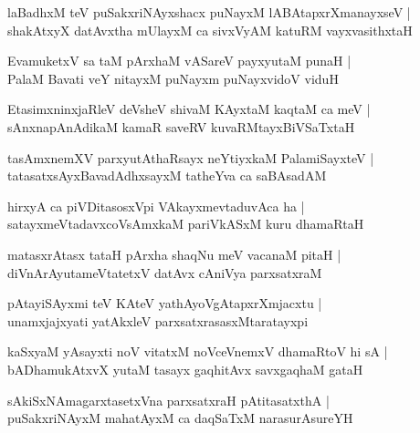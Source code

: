 \documentclass[twoside,12pt,openright]{book}
\newcounter{shloka}[chapter]
\begin{document}
\begin{shloka}%
laBadhxM teV puSakxriNAyxshacx puNayxM lABAtapxrXmanayxseV |\\
shakAtxyX datAvxtha mUlayxM ca sivxVyAM katuRM vayxvasithxtaH 
\end{shloka}

\begin{shloka}%
EvamuketxV sa taM pArxhaM vASareV payxyutaM punaH |\\
PalaM Bavati veY nitayxM puNayxm puNayxvidoV viduH 
\end{shloka}

\begin{shloka}%
EtasimxninxjaRleV deVsheV shivaM KAyxtaM kaqtaM ca meV |\\
sAnxnapAnAdikaM kamaR saveRV kuvaRMtayxBiVSaTxtaH 	
\end{shloka}

\begin{shloka}%
tasAmxnemXV parxyutAthaRsayx neYtiyxkaM PalamiSayxteV |\\
tatasatxsAyxBavadAdhxsayxM tatheYva ca saBAsadAM 
\end{shloka}

\begin{shloka}%
hirxyA ca piVDitasosxVpi VAkayxmevtaduvAca ha |\\
satayxmeVtadavxcoVsAmxkaM pariVkASxM kuru dhamaRtaH
\end{shloka}

\begin{shloka}%
matasxrAtasx tataH pArxha shaqNu meV vacanaM pitaH |\\
diVnArAyutameVtatetxV datAvx cAniVya parxsatxraM 
\end{shloka}

\begin{shloka}%
pAtayiSAyxmi teV KAteV yathAyoVgAtapxrXmjacxtu |\\
unamxjajxyati yatAkxleV parxsatxrasasxMtaratayxpi
\end{shloka}

\begin{shloka}%
kaSxyaM yAsayxti noV vitatxM noVceVnemxV dhamaRtoV hi sA |\\
bADhamukAtxvX yutaM tasayx gaqhitAvx savxgaqhaM gataH 
\end{shloka}

\begin{shloka}%
sAkiSxNAmagarxtasetxVna parxsatxraH pAtitasatxthA |\\
puSakxriNAyxM mahatAyxM ca daqSaTxM narasurAsureYH 
\end{shloka}
\end{document}
